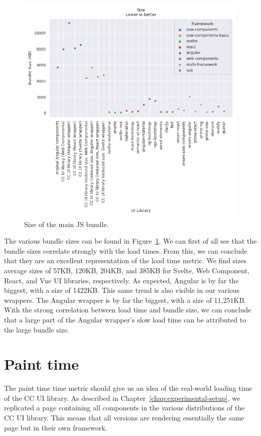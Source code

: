 \begin{figure}[h]
  \includegraphics[width=\columnwidth]{plots/size.png}
  \caption{Size of the main JS bundle.}
  \label{fig:results:size}
  \centering
\end{figure}


The various bundle sizes can be found in Figure~\ref{fig:results:size}. We can first of all see that the bundle sizes correlate strongly with the load times. From this, we can conclude that they are an excellent representation of the load time metric. We find sizes average sizes of 57KB, 120KB, 204KB, and 385KB for Svelte, Web Component, React, and Vue UI libraries, respectively. As expected, Angular is by far the biggest, with a size of 1422KB. This same trend is also visible in our various wrappers. The Angular wrapper is by far the biggest, with a size of 11,251KB. With the strong correlation between load time and bundle size, we can conclude that a large part of the Angular wrapper's slow load time can be attributed to the large bundle size.

\section{Paint time}
The paint time time metric should give us an idea of the real-world loading time of the CC UI library. As described in Chapter~\ref{chap:experimental-setup}, we replicated a page containing all components in the various distributions of the CC UI library. This means that all versions are rendering essentially the same page but in their own framework.

